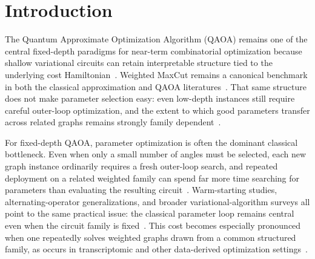 \documentclass[
  reprint,
  twocolumn,
  aps,
  superscriptaddress,
  longbibliography,
  floatfix
]{revtex4-2}
\begin{document}
\begin{abstract}
gaps under local depolarizing noise. The resulting picture is sharper and more limited: reusing search effort works best on biomedical graph families whose good angles stay tightly grouped, whereas out-of-family failure can be anticipated once transferred predictions leave that region.
\end{abstract}

\maketitle

\section{Introduction}
The Quantum Approximate Optimization Algorithm (QAOA) remains one of the central fixed-depth paradigms for near-term combinatorial optimization because shallow variational circuits can retain interpretable structure tied to the underlying cost Hamiltonian~\cite{zhou2020,akshay2021}. Weighted MaxCut remains a canonical benchmark in both the classical approximation and QAOA literatures~\cite{goemans1995,farhi2014,crooks2018}. That same structure does not make parameter selection easy: even low-depth instances still require careful outer-loop optimization, and the extent to which good parameters transfer across related graphs remains strongly family dependent~\cite{galda2021,wurtz2021}.

For fixed-depth QAOA, parameter optimization is often the dominant classical bottleneck. Even when only a small number of angles must be selected, each new graph instance ordinarily requires a fresh outer-loop search, and repeated deployment on a related weighted family can spend far more time searching for parameters than evaluating the resulting circuit~\cite{zhou2020,galda2021}. Warm-starting studies, alternating-operator generalizations, and broader variational-algorithm surveys all point to the same practical issue: the classical parameter loop remains central even when the circuit family is fixed~\cite{egger2021,hadfield2019,cerezo2021}. This cost becomes especially pronounced when one repeatedly solves weighted graphs drawn from a common structured family, as occurs in transcriptomic and other data-derived optimization settings~\cite{akshay2021,wurtz2021}.
\end{document}
